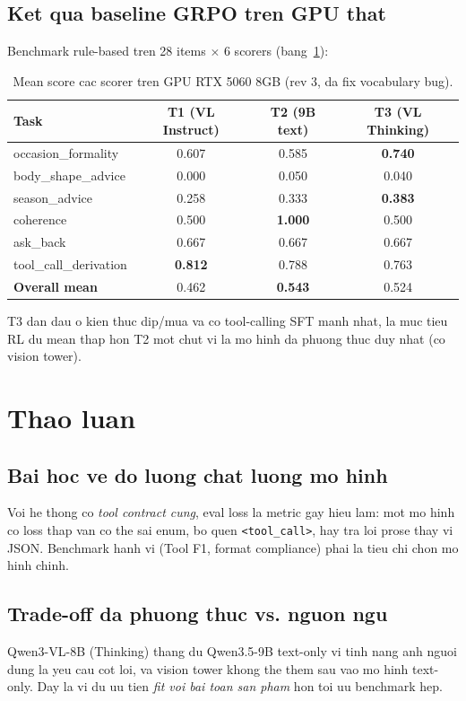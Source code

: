 \documentclass[12pt,a4paper]{article}
\begin{document}
\subsection{Ket qua baseline GRPO tren GPU that}
Benchmark rule-based tren 28 items $\times$ 6 scorers (bang~\ref{tab:gpu}):
\begin{table}[H]
  \centering
  \caption{Mean score cac scorer tren GPU RTX 5060 8GB (rev 3, da fix vocabulary bug).}
  \label{tab:gpu}
  \begin{tabular}{lccc}
    \toprule
    Task & T1 (VL Instruct) & T2 (9B text) & T3 (VL Thinking) \\
    \midrule
    occasion\_formality & 0.607 & 0.585 & \textbf{0.740} \\
    body\_shape\_advice & 0.000 & 0.050 & 0.040 \\
    season\_advice & 0.258 & 0.333 & \textbf{0.383} \\
    coherence & 0.500 & \textbf{1.000} & 0.500 \\
    ask\_back & 0.667 & 0.667 & 0.667 \\
    tool\_call\_derivation & \textbf{0.812} & 0.788 & 0.763 \\
    \textbf{Overall mean} & 0.462 & \textbf{0.543} & 0.524 \\
    \bottomrule
  \end{tabular}
\end{table}
T3 dan dau o kien thuc dip/mua va co tool-calling SFT manh nhat, la muc tieu RL du mean thap
hon T2 mot chut vi la mo hinh da phuong thuc duy nhat (co vision tower).
\section{Thao luan}
\label{sec:discuss}
\subsection{Bai hoc ve do luong chat luong mo hinh}
Voi he thong co \emph{tool contract cung}, eval loss la metric gay hieu lam: mot mo hinh co
loss thap van co the sai enum, bo quen \texttt{<tool\_call>}, hay tra loi prose thay vi JSON.
Benchmark hanh vi (Tool F1, format compliance) phai la tieu chi chon mo hinh chinh.
\subsection{Trade-off da phuong thuc vs. nguon ngu}
Qwen3-VL-8B (Thinking) thang du Qwen3.5-9B text-only vi tinh nang anh nguoi dung la yeu cau
cot loi, va vision tower khong the them sau vao mo hinh text-only. Day la vi du uu tien
\emph{fit voi bai toan san pham} hon toi uu benchmark hep.
\end{document}
